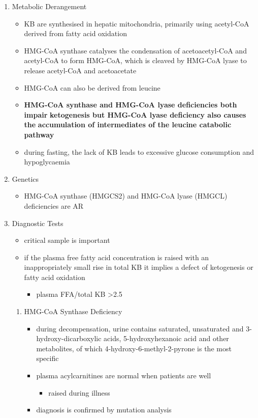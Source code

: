 \documentclass{scrartcl}
\begin{document}
\begin{enumerate}
\item Metabolic Derangement
\label{sec:org49ffd5c}
\begin{itemize}
\item KB are synthesised in hepatic mitochondria, primarily using
acetyl-CoA derived from fatty acid oxidation
\item HMG-CoA synthase catalyses the condensation of acetoacetyl-CoA and
acetyl-CoA to form HMG-CoA, which is cleaved by HMG-CoA lyase to
release acetyl-CoA and acetoacetate
\item HMG-CoA can also be derived from leucine
\item \textbf{HMG-CoA synthase and HMG-CoA lyase deficiencies both impair}
\textbf{ketogenesis but HMG-CoA lyase deficiency also causes the}
\textbf{accumulation of intermediates of the leucine catabolic pathway}
\item during fasting, the lack of KB leads to excessive glucose
consumption and hypoglycaemia
\end{itemize}

\item Genetics
\label{sec:orgb8a583c}
\begin{itemize}
\item HMG-CoA synthase (HMGCS2) and HMG-CoA lyase (HMGCL) deficiencies are
AR
\end{itemize}

\item Diagnostic Tests
\label{sec:orga5dfb75}
\begin{itemize}
\item critical sample is important
\item if the plasma free fatty acid concentration is raised with an
inappropriately small rise in total KB it implies a defect of
ketogenesis or fatty acid oxidation 
\begin{itemize}
\item plasma FFA/total KB >2.5
\end{itemize}
\end{itemize}

\begin{enumerate}
\item HMG-CoA Synthase Deficiency
\label{sec:org0a5bac8}
\begin{itemize}
\item during decompensation, urine contains saturated, unsaturated and
3-hydroxy-dicarboxylic acids, 5-hydroxyhexanoic acid and other
metabolites, of which 4-hydroxy-6-methyl-2-pyrone is the most
specific
\item plasma acylcarnitines are normal when patients are well
\begin{itemize}
\item raised during illness
\end{itemize}
\item diagnosis is confirmed by mutation analysis
\end{itemize}


\end{enumerate}
\end{enumerate}
\end{document}
